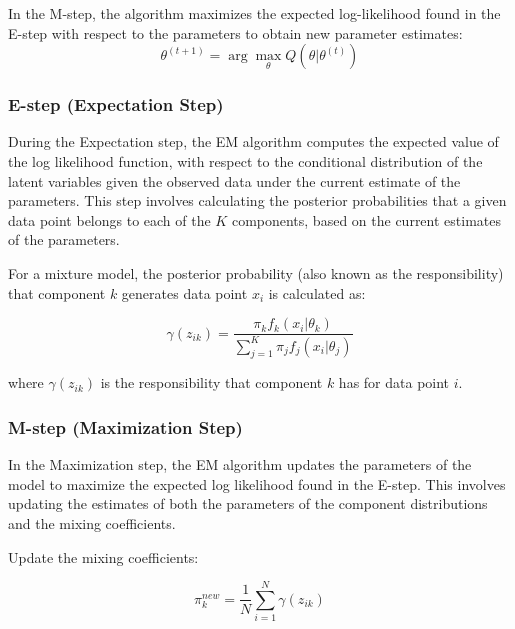 \documentclass{article}
\begin{document}
In the M-step, the algorithm maximizes the expected log-likelihood found in the E-step with respect to the parameters to obtain new parameter estimates:
\begin{equation}
\theta^{(t+1)} = \arg \max_{\theta} Q(\theta | \theta^{(t)})
\end{equation}

\subsubsection{E-step (Expectation Step)}

During the Expectation step, the EM algorithm computes the expected value of the log likelihood function, with respect to the conditional distribution of the latent variables given the observed data under the current estimate of the parameters. This step involves calculating the posterior probabilities that a given data point belongs to each of the $K$ components, based on the current estimates of the parameters.

For a mixture model, the posterior probability (also known as the responsibility) that component $k$ generates data point $x_i$ is calculated as:

\begin{equation}
\gamma(z_{ik}) = \frac{\pi_k f_k(x_i|\theta_k)}{\sum_{j=1}^{K} \pi_j f_j(x_i|\theta_j)}
\end{equation}

where $\gamma(z_{ik})$ is the responsibility that component $k$ has for data point $i$.

\subsubsection{M-step (Maximization Step)}

In the Maximization step, the EM algorithm updates the parameters of the model to maximize the expected log likelihood found in the E-step. 
This involves updating the estimates of both the parameters of the component distributions and the mixing coefficients.

Update the mixing coefficients:

\begin{equation}
\pi_k^{new} = \frac{1}{N} \sum_{i=1}^{N} \gamma(z_{ik})
\end{equation}

\end{document}
